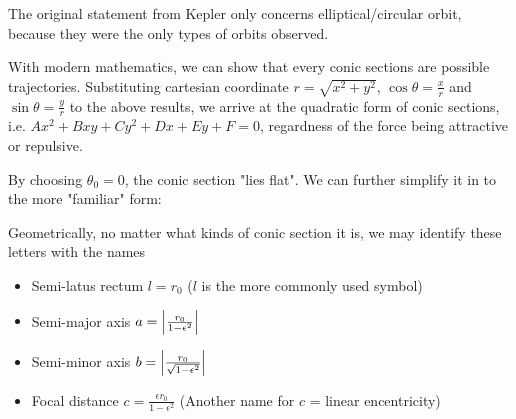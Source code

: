 \documentclass[class=article, crop=false, 12pt]{standalone}
\begin{document}
The original statement from Kepler only concerns elliptical/circular orbit, because they were the only types of orbits observed.


With modern mathematics, we can show that every conic sections are possible trajectories. 
Substituting cartesian coordinate $r=\sqrt{x^2+y^2}$, $\cos{\theta}=\frac{x}{r}$ and $\sin{\theta}=\frac{y}{r}$ to the above results,
we arrive at the quadratic form of conic sections, i.e. $Ax^2+Bxy+Cy^2+Dx+Ey+F=0$, regardness of the force being attractive or repulsive.

By choosing $\theta_0 = 0$, the conic section "lies flat". We can further simplify it in to the more "familiar" form:

Geometrically, no matter what kinds of conic section it is, we may identify these letters with the names

\begin{itemize}
    \item Semi-latus rectum $l = r_0$ \qquad ($l$ is the more commonly used symbol)
    \item Semi-major axis $a = \abs{\frac{r_0}{1-\epsilon^2}}$
    \item Semi-minor axis $b = \abs{\frac{r_0}{\sqrt{1-\epsilon^2}}}$ 
    \item Focal distance $c = \frac{\epsilon r_0}{1-\epsilon^2}$ \qquad\qquad  (Another name for $c$ = linear encentricity)
\end{itemize}
\end{document}
